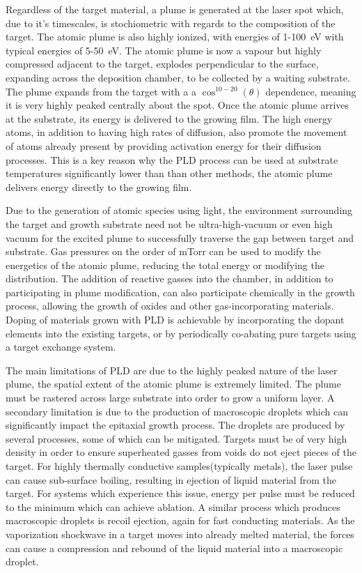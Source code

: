 Regardless of the target material, a plume is generated at the laser spot which, due to it's timescales, is stochiometric with regards to the composition of the target. The atomic plume is also highly ionized, with energies of 1-100~eV with typical energies of 5-50~eV. The atomic plume is now a vapour but highly compressed adjacent to the target, explodes perpendicular to the surface, expanding across the deposition chamber, to be collected by a waiting substrate. The plume expands from the target with a a $\cos^{10-20}(\theta)$ dependence, meaning it is very highly peaked centrally about the spot. Once the atomic plume arrives at the substrate, its energy is delivered to the growing film. The high energy atoms, in addition to having high rates of diffusion, also promote the movement of atoms already present by providing activation energy for their diffusion processes. This is a key reason why the PLD process can be used at substrate temperatures significantly lower than than other methods, the atomic plume delivers energy directly to the growing film.

Due to the generation of atomic species using light, the environment surrounding the target and growth substrate need not be ultra-high-vacuum or even high vacuum for the excited plume to successfully traverse the gap between target and substrate. Gas pressures on the order of mTorr can be used to modify the energetics of the atomic plume, reducing the total energy or modifying the distribution. The addition of reactive gasses into the chamber, in addition to participating in plume modification, can also participate chemically in the growth process, allowing the growth of oxides and other gas-incorporating materials. Doping of materials grown with PLD is achievable by incorporating the dopant elements into the existing targets, or by periodically co-abating pure targets using a target exchange system.

The main limitations of PLD are due to the highly peaked nature of the laser plume, the spatial extent of the atomic plume is extremely limited. The plume must be rastered across large substrate into order to grow a uniform layer. A secondary limitation is due to the production of macroscopic droplets which can significantly impact the epitaxial growth process. The droplets are produced by several processes, some of which can be mitigated. Targets must be of very high density in order to ensure superheated gasses from voids do not eject pieces of the target. For highly thermally conductive samples(typically metals), the laser pulse can cause sub-surface boiling, resulting in ejection of liquid material from the target. For systems which experience this issue, energy per pulse must be reduced to the minimum which can achieve ablation. A similar process which produces macroscopic droplets is recoil ejection, again for fast conducting materials. As the vaporization shockwave in a target moves into already melted material, the forces can cause a compression and rebound of the liquid material into a macroscopic droplet.


